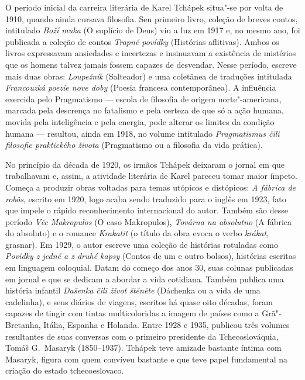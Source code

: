 O período inicial da carreira literária de Karel Tchápek situa"-se por volta de
1910, quando ainda cursava filosofia. Seu primeiro livro,
coleção de breves contos, intitulado \textit{Boží muka} (O suplício de Deus) viu a luz
em 1917 e, no mesmo ano, foi publicada a coleção de contos \textit{Trapné povídky} (Histórias aflitivas). 
 Ambos os livros expressavam ansiedades e incertezas e
insinuavam a existência de mistérios que os homens talvez jamais fossem capazes
de desvendar. Nesse período, escreve mais duas obras: \textit{Loupežník} (Salteador) e
uma coletânea de traduções intitulada \textit{Francouzká poezie nove doby} (Poesia francesa contemporânea). 
A influência exercida pelo Pragmatismo --- escola de filosofia
de origem norte"-americana, marcada pela descrença no fatalismo e pela certeza
de que só a ação humana, movida pela inteligência e pela energia, pode alterar
os limites da condição humana --- resultou, ainda em 1918, no volume intitulado 
\textit{Pragmatismus čili filosofie praktického života} (Pragmatismo ou a filosofia da vida prática). 

No princípio da década de 1920, os irmãos Tchápek deixaram o jornal em que
trabalhavam e, assim, a atividade literária de Karel pareceu tomar maior
ímpeto. Começa a produzir obras voltadas para temas utópicos e distópicos:  \textit{A fábrica de robôs}, 
escrito em 1920, logo acaba sendo traduzido para o inglês em 1923, fato que impele o rápido
reconhecimento internacional do autor. Também são desse período \textit{V\u{e}c Makropulos} (O caso
Makropulos), \textit{Továrna na absolutno} (A fábrica do absoluto)
e o romance \textit{Krakatit} (o título da obra evoca o verbo \textit{krákat}, grasnar). Em
1929, o autor escreve uma coleção de histórias rotuladas como \textit{Povídky z jedné a z druhé kapsy} (Contos de um e
outro bolsos), histórias escritas em linguagem
coloquial. Datam do começo dos anos 30, suas colunas publicadas em jornal e que
se dedicam a abordar a vida cotidiana. Também publica uma história infantil \textit{Dašenka čili život št\u{e}n\u{e}te}
(Dáchenka ou a vida de uma cadelinha), e seus diários de viagens, escritos há quase oito décadas, foram capazes de tingir com
tintas multicoloridas a imagem de países como a Grã"-Bretanha, Itália, Espanha
e Holanda. Entre 1928 e 1935, publicou
três volumes resultantes de suas conversas com o primeiro presidente da
Tchecoslováquia, Tomáš G.~Masaryk (1850--1937). Tchápek teve amizade bastante
íntima com Masaryk, figura com quem conviveu bastante e que teve papel
fundamental na criação do estado tchecoeslovaco.

